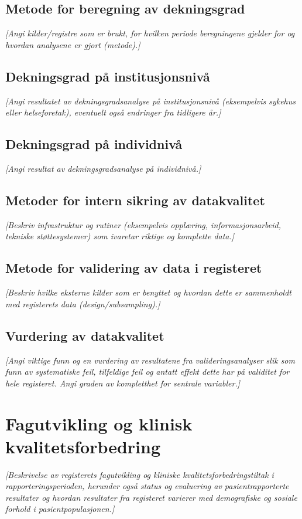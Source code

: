 \documentclass[norsk, a4paper, twocolumn]{report}
\newcommand{\guide}[1] {
	\textit{[\textcolor{guidegray}{#1}]}
	}
\begin{document}
\section{Metode for beregning av dekningsgrad}\label{sec:met}
\guide{Angi kilder/registre som er brukt, for hvilken periode beregningene
gjelder for og hvordan analysene er gjort (metode).}

\section{Dekningsgrad på institusjonsnivå}\label{sec:endek}
\guide{Angi resultatet av dekningsgradsanalyse på institusjonsnivå
(eksempelvis sykehus eller helseforetak),
eventuelt også endringer fra tidligere år.}

\section{Dekningsgrad på individnivå}\label{sec:obs}
\guide{Angi resultat av dekningsgradsanalyse på individnivå.}

\section{Metoder for intern sikring av datakvalitet}\label{sec:sik}
\guide{Beskriv infrastruktur og rutiner (eksempelvis
opplæring, informasjonsarbeid, tekniske støttesystemer) som ivaretar riktige og
komplette data.}

\section{Metode for validering av data i registeret}\label{sec:metval}
\guide{Beskriv hvilke eksterne kilder som er benyttet og hvordan
dette er sammenholdt med registerets data (design/subsampling).} 

\section{Vurdering av datakvalitet}\label{sec:valdat}
\guide{Angi viktige funn og en vurdering av resultatene fra
valideringsanalyser slik som funn av systematiske feil, tilfeldige feil og
antatt effekt dette har på validitet for hele registeret. Angi graden av
kompletthet for sentrale variabler.}




\chapter{Fagutvikling og klinisk kvalitetsforbedring}\label{cha:fag}
\guide{Beskrivelse av registerets fagutvikling og kliniske
kvalitetsforbedringstiltak
i rapporteringsperioden, herunder også status og evaluering av
pasientrapporterte resultater og hvordan resultater fra registeret varierer med
demografiske og sosiale forhold i pasientpopulasjonen.}
\end{document}
